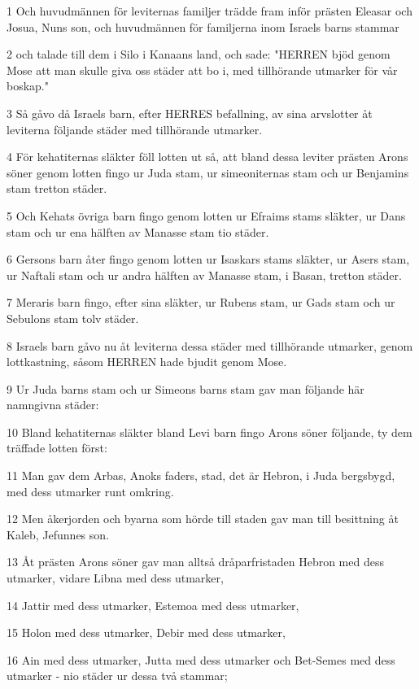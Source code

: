 \par 1 Och huvudmännen för leviternas familjer trädde fram inför prästen Eleasar och Josua, Nuns son, och huvudmännen för familjerna inom Israels barns stammar
\par 2 och talade till dem i Silo i Kanaans land, och sade: "HERREN bjöd genom Mose att man skulle giva oss städer att bo i, med tillhörande utmarker för vår boskap."
\par 3 Så gåvo då Israels barn, efter HERRES befallning, av sina arvslotter åt leviterna följande städer med tillhörande utmarker.
\par 4 För kehatiternas släkter föll lotten ut så, att bland dessa leviter prästen Arons söner genom lotten fingo ur Juda stam, ur simeoniternas stam och ur Benjamins stam tretton städer.
\par 5 Och Kehats övriga barn fingo genom lotten ur Efraims stams släkter, ur Dans stam och ur ena hälften av Manasse stam tio städer.
\par 6 Gersons barn åter fingo genom lotten ur Isaskars stams släkter, ur Asers stam, ur Naftali stam och ur andra hälften av Manasse stam, i Basan, tretton städer.
\par 7 Meraris barn fingo, efter sina släkter, ur Rubens stam, ur Gads stam och ur Sebulons stam tolv städer.
\par 8 Israels barn gåvo nu åt leviterna dessa städer med tillhörande utmarker, genom lottkastning, såsom HERREN hade bjudit genom Mose.
\par 9 Ur Juda barns stam och ur Simeons barns stam gav man följande här namngivna städer:
\par 10 Bland kehatiternas släkter bland Levi barn fingo Arons söner följande, ty dem träffade lotten först:
\par 11 Man gav dem Arbas, Anoks faders, stad, det är Hebron, i Juda bergsbygd, med dess utmarker runt omkring.
\par 12 Men åkerjorden och byarna som hörde till staden gav man till besittning åt Kaleb, Jefunnes son.
\par 13 Åt prästen Arons söner gav man alltså dråparfristaden Hebron med dess utmarker, vidare Libna med dess utmarker,
\par 14 Jattir med dess utmarker, Estemoa med dess utmarker,
\par 15 Holon med dess utmarker, Debir med dess utmarker,
\par 16 Ain med dess utmarker, Jutta med dess utmarker och Bet-Semes med dess utmarker - nio städer ur dessa två stammar;
